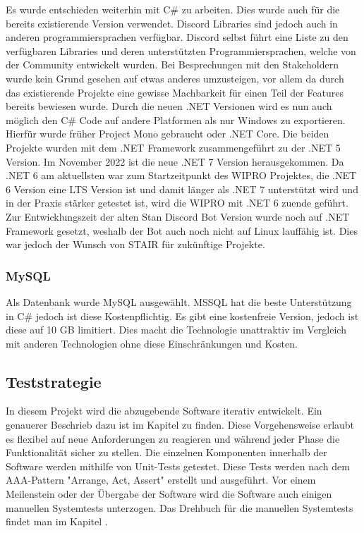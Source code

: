 \documentclass[a4paper, table]{article}
\begin{document}
Es wurde entschieden weiterhin mit C\# zu arbeiten.
Dies wurde auch für die bereits existierende Version verwendet.
Discord Libraries sind jedoch auch in anderen programmiersprachen verfügbar.
Discord selbst führt eine Liste zu den verfügbaren Libraries und deren unterstützten Programmiersprachen, welche von der Community entwickelt wurden.\autocite{noauthor_discord_2022-1}
Bei Besprechungen mit den Stakeholdern wurde kein Grund gesehen auf etwas anderes umzusteigen, vor allem da durch das existierende Projekte eine gewisse Machbarkeit für einen Teil der Features bereits bewiesen wurde.
Durch die neuen .NET Versionen wird es nun auch möglich den C\# Code auf andere Platformen als nur Windows zu exportieren.
Hierfür wurde früher Project Mono gebraucht oder .NET Core.
Die beiden Projekte wurden mit dem .NET Framework zusammengeführt zu der .NET 5 Version.\autocite{schwichtenberg_net_2019}
Im November 2022 ist die neue .NET 7 Version herausgekommen.
Da .NET 6 am aktuellsten war zum Startzeitpunkt des WIPRO Projektes, die .NET 6 Version eine LTS Version ist und damit länger als .NET 7 unterstützt wird und in der Praxis stärker getestet ist, wird die WIPRO mit .NET 6 zuende geführt.\autocite{noauthor_net_2022}
Zur Entwicklungszeit der alten Stan Discord Bot Version wurde noch auf .NET Framework gesetzt, weshalb der Bot auch noch nicht auf Linux lauffähig ist.
Dies war jedoch der Wunsch von STAIR für zukünftige Projekte.


\subsubsection{MySQL}

Als Datenbank wurde MySQL ausgewählt.
MSSQL hat die beste Unterstützung in C\# jedoch ist diese Kostenpflichtig.
Es gibt eine kostenfreie Version, jedoch ist diese auf 10 GB limitiert.
Dies macht die Technologie unattraktiv im Vergleich mit anderen Technologien ohne diese Einschränkungen und Kosten.\autocite{noauthor_sql_nodate}


\subsection{Teststrategie}\label{Teststrategie}
In diesem Projekt wird die abzugebende Software iterativ entwickelt.
Ein genauerer Beschrieb dazu ist im Kapitel  zu finden.
Diese Vorgehensweise erlaubt es flexibel auf neue Anforderungen zu reagieren und
während jeder Phase die Funktionalität sicher zu stellen.
\newline
Die einzelnen Komponenten innerhalb der Software werden mithilfe von Unit-Tests getestet.
Diese Tests werden nach dem AAA-Pattern "Arrange, Act, Assert" erstellt und ausgeführt. \autocite{noauthor_arrangeactassert_nodate}
Vor einem Meilenstein oder der Übergabe der Software wird die Software auch einigen manuellen Systemtests unterzogen.
\newline
Das Drehbuch für die manuellen Systemtests findet man im Kapitel .
\end{document}
